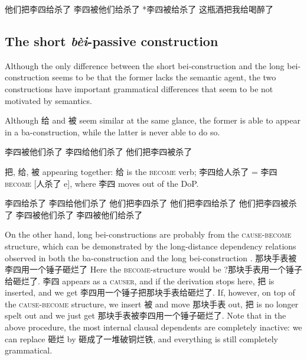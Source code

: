 \documentclass[UTF8, a4paper, oneside, scheme=plain, 12pt]{ctexrep}
\newcommand*{\citesec}[1]{\S~{#1}}
\newcommand{\form}[1]{\emph{#1}}
\newcommand*{\category}[1]{\textsc{#1}}
\begin{document}
\begin{exe}
    \ex\label{ex:verb-phrase.gei.ba-1} 他们把李四给杀了
    \ex\label{ex:verb-phrase.gei.bei-1} 李四被他们给杀了
    \ex\label{ex:verb-phrase.gei.bei-2} *李四被给杀了
    \ex\label{ex:verb-phrase.gei.ba-2} 这瓶酒把我给喝醉了
\end{exe}

\subsection{The short \form{bèi}-passive construction}\label{sec:verb-phrase.object.short-bei}

Although the only difference between the short bei-construction 
and the long bei-construction 
seems to be that the former lacks the semantic agent, 
the two constructions have important grammatical differences 
that seem to be not motivated by semantics. 

Although 给 and 被 seem similar at the same glance, 
the former is able to appear in a ba-construction, 
while the latter is never able to do so. 

\begin{exe}
    \ex 李四被他们杀了
    \ex 李四给他们杀了
    \ex *他们把李四被杀了
\end{exe}

把, 给, 被 appearing together: 给 is the \category{become} verb; 
李四给人杀了 = 李四 \category{become} [人杀了 e], 
where 李四 moves out of the DoP.

\begin{exe}
    \ex 李四给杀了
    \ex 李四给他们杀了
    \ex 他们把李四杀了
    \ex 他们把李四给杀了
    \ex *他们把李四被杀了
    \ex 李四被他们杀了
    \ex 李四被他们给杀了
\end{exe}

On the other hand, long bei-constructions are probably 
from the \category{cause}-\category{become} structure,
which can be demonstrated by the long-distance dependency relations 
observed in both the ba-construction  
and the long bei-construction
\citep[\citesec{4.2.1.5}]{huang2013}.
那块手表被李四用一个锤子砸烂了 
Here the \category{become}-structure would be 
?那块手表用一个锤子给砸烂了. 
李四 appears as a \category{causer},
and if the derivation stops here, 
把 is inserted, and we get 李四用一个锤子把那块手表给砸烂了.
If, however, on top of the \category{cause}-\category{become} structure, 
we insert 被 and move 那块手表 out, 
把 is no longer spelt out 
and we just get 那块手表被李四用一个锤子砸烂了.
Note that in the above procedure, 
the most internal clausal dependents are completely inactive: 
we can replace 砸烂 by 砸成了一堆破铜烂铁, 
and everything is still completely grammatical.
\end{document}
